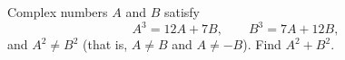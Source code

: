 Complex numbers $A$ and $B$ satisfy
\[
A^3=12A+7B,\qquad B^3=7A+12B,
\]
and $A^2\ne B^2$ (that is, $A\ne B$ and $A\ne-B$). Find $A^2+B^2$.
